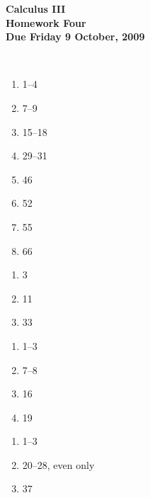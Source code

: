 \documentclass[12pt]{article}
\begin{document}
\pagestyle{empty}
 
\begin{center}
{\large {\bf Calculus III}}\\
\medskip
{\large {\bf Homework Four}}\\
\medskip
{ {\bf Due Friday 9 October, 2009}}\\
\end{center}

\hspace{2mm}\\


\begin{enumerate}
\setlength{\itemsep}{-1mm}
  \item 1--4
  \item 7--9
  \item 15--18
  \item 29--31
  \item 46
  \item 52
  \item 55
  \item 66 
\end{enumerate}


\begin{enumerate}
\setlength{\itemsep}{-1mm}
  \item 3
  \item 11
  \item 33
\end{enumerate}


\begin{enumerate}
\setlength{\itemsep}{-1mm}
  \item 1--3
  \item 7--8
  \item 16
  \item 19
\end{enumerate}


\begin{enumerate}
\setlength{\itemsep}{-1mm}
  \item 1--3
  \item 20--28, even only
  \item 37
\end{enumerate}
\end{document}
